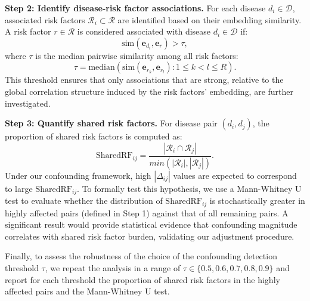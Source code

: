 \textbf{Step 2: Identify disease-risk factor associations.} For each disease $d_i \in \mathcal{D}$, associated risk factors $\mathcal{R}_i \subset \mathcal{R}$ are identified based on their embedding similarity. A risk factor $r \in \mathcal{R}$ is considered associated with disease $d_i \in \mathcal{D}$ if:
\begin{equation}\label{eq:rf_threshold}
\text{sim}(\mathbf{e}_{d_i}, \mathbf{e}_{r}) > \tau,
\end{equation}
where $\tau$ is the median pairwise similarity among all risk factors: 
\begin{equation} \tau = \text{median} \left( { \text{sim}(\mathbf{e}_{r_k}, \mathbf{e}_{r_l}) : 1 \le k < l \le R } \right). 
\end{equation}
This threshold ensures that only associations that are strong, relative to the global correlation structure induced by the risk factors' embedding, are further investigated.

\textbf{Step 3: Quantify shared risk factors.}
For disease pair $(d_i, d_j)$, the proportion of shared risk factors is computed as:
\begin{equation}\label{eq:shared_rf}
\text{SharedRF}_{ij} = \frac{|\mathcal{R}_i \cap \mathcal{R}_j|}{min(|\mathcal{R}_i|, | \mathcal{R}_j|)}.
\end{equation}
Under our confounding framework, high $|\Delta_{ij}|$ values are expected to correspond to large $\text{SharedRF}_{ij}$. To formally test this hypothesis, we use a Mann-Whitney U test to evaluate whether the distribution of $\text{SharedRF}_{ij}$ is stochastically greater in highly affected pairs (defined in Step 1) against that of all remaining pairs. A significant result would provide statistical evidence that confounding magnitude correlates with shared risk factor burden, validating our adjustment procedure.

Finally, to assess the robustness of the choice of the confounding detection threshold $\tau$, we repeat the analysis in a range of $\tau \in \{0.5, 0.6, 0.7, 0.8, 0.9\}$ and report for each threshold the proportion of shared risk factors in the highly affected pairs and the Mann-Whitney U test.


